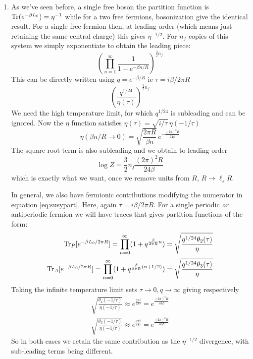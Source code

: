 \documentclass[11pt, class=article, crop=false]{standalone}
\begin{document}
\begin{enumerate}
	\item
	As we've seen before, a single free boson the partition function is $\mathrm{Tr}(e^{-\beta L_0}) = \eta^{-1}$ while for a two free fermions, bosonization give the identical result. For a single free fermion then, at leading order (which means just retaining the same central charge) this gives $\eta^{-1/2}$. For $n_f$ copies of this system we simply exponentiate to obtain the leading piece:
	\begin{equation}\label{eq:susypart}
		\left(\prod_{n=1}^\infty \frac{1}{1-e^{-\beta n/R}} \right)^{\frac32 n_f}
	\end{equation}
	This can be directly written using $q = e^{-\beta/ R}$ ie $\tau = i \beta /2 \pi R$
	\[
		\left(\frac{q^{1/{24}}}{\eta(\tau)}\right)^{\frac32 n_f}
	\]
	We need the high temperature limit, for which $q^{1/24}$ is subleading and can be ignored. 
	Now the $\eta$ function satisfies $\eta(\tau) = \sqrt{i/\tau} \, \eta(-1/\tau)$ 
	\[
		\eta(\beta n/R \to 0) = \sqrt{\frac{2 \pi R}{\beta n}}\, e^{-\frac{(2 \pi)^2 R}{24 \beta}}
	\]
	The square-root term is also subleading and we obtain to leading order
	\[
		\log Z = \frac32 n_f \frac{(2\pi)^2 R}{24 \beta}
	\]
	which is exactly what we want, once we remove units from $R$, $R \to \ell_s R$.
	
	In general, we also have fermionic contributions modifying the numerator in equation \eqref{eq:susypart}. Here, again $\tau = i \beta / 2 \pi R$. For a single periodic \emph{or} antiperiodic fermion we will have traces that gives partition functions of the form:
	\[
	\begin{aligned}
		\mathrm{Tr}_{P} [e^{-\beta L_0/2\pi R}]  = \prod_{n = 0}^\infty (1 + q^{\frac{\beta}{2 \pi R} n})  = \sqrt{\frac{q^{1/24} \theta_{2}(\tau)}{\eta}}\\
		\mathrm{Tr}_{A} [e^{-\beta L_0/2\pi R}]  = \prod_{n = 0}^\infty (1 + q^{\frac{\beta}{2 \pi R} (n+1/2)})  = \sqrt{\frac{q^{1/24} \theta_{3}(\tau)}{\eta}}
	\end{aligned}
	\]
	Taking the infinite temperature limit sets $\tau \to 0, q \to \infty$ giving respectively
	\[
		\begin{aligned}
			\sqrt{ \frac{\theta_4 (-1/\tau)}{\eta(-1/\tau)}} \approx e^{\frac{2 \pi i}{48 \tau}} = e^{\frac{(2 \pi)^2 R}{48 \beta}}\\
			\sqrt{ \frac{\theta_3 (-1/\tau)}{\eta(-1/\tau)}} \approx e^{\frac{2 \pi i}{48 \tau}} = e^{\frac{(2 \pi)^2 R}{48 \beta}}
		\end{aligned}
	\]
	So in both cases we retain the same contribution as the $\eta^{-1/2}$ divergence, with sub-leading terms being different. 
	
	
	
\end{enumerate}
\end{document}
